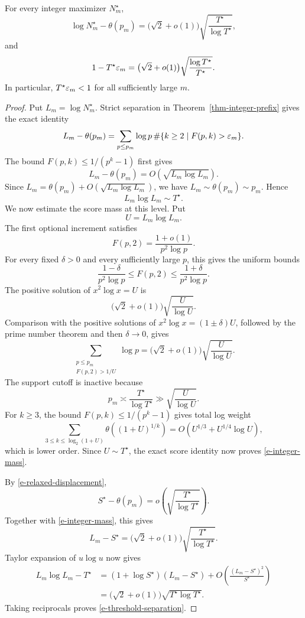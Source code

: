 \begin{proposition}
\label{prop-integer-threshold-scale}
For every integer maximizer \(N_m^\star\),
\begin{equation}
\label{e-integer-mass}
    \log N_m^\star-\theta(p_m)
    =
    \bigl(\sqrt2+o(1)\bigr)
    \sqrt{\frac{T^\star}{\log T^\star}},
\end{equation}
and
\begin{equation}
\label{e-threshold-separation}
    1-T^\star\varepsilon_m
    =
    \bigl(\sqrt2+o(1)\bigr)
    \sqrt{\frac{\log T^\star}{T^\star}}.
\end{equation}
In particular, \(T^\star\varepsilon_m<1\) for all sufficiently large \(m\).
\end{proposition}

\begin{proof}
Put \(L_m=\log N_m^\star\). Strict separation in
Theorem~\ref{thm-integer-prefix} gives the exact identity
\[
    L_m-\theta(p_m)
    =
    \sum_{p\leq p_m}\log p\,
    \#\{k\geq2\mid F(p,k)>\varepsilon_m\}.
\]
The bound \(F(p,k)\leq1/(p^k-1)\) first gives
\[
    L_m-\theta(p_m)
    =
    O\left(\sqrt{L_m\log L_m}\right).
\]
Since \(L_m=\theta(p_m)+O(\sqrt{L_m\log L_m})\), we have
\(L_m\sim\theta(p_m)\sim p_m\). Hence
\[
    L_m\log L_m\sim T^\star.
\]
We now estimate the score mass at this level. Put
\[
    U=L_m\log L_m.
\]
The first optional increment satisfies
\[
    F(p,2)
    =
    \frac{1+o(1)}{p^2\log p}.
\]
For every fixed \(\delta>0\) and every sufficiently large \(p\), this
gives the uniform bounds
\[
    \frac{1-\delta}{p^2\log p}
    \leq
    F(p,2)
    \leq
    \frac{1+\delta}{p^2\log p}.
\]
The positive solution of \(x^2\log x=U\) is
\[
    \bigl(\sqrt2+o(1)\bigr)
    \sqrt{\frac{U}{\log U}}.
\]
Comparison with the positive solutions of
\(x^2\log x=(1\pm\delta)U\), followed by the prime number theorem and
then \(\delta\to0\), gives
\[
    \sum_{\substack{p\leq p_m\\ F(p,2)>1/U}}\log p
    =
    \bigl(\sqrt2+o(1)\bigr)
    \sqrt{\frac{U}{\log U}}.
\]
The support cutoff is inactive because
\[
    p_m\asymp\frac{T^\star}{\log T^\star}
    \gg\sqrt{\frac{U}{\log U}}.
\]
For \(k\geq3\), the bound \(F(p,k)\leq1/(p^k-1)\) gives total log weight
\[
    \sum_{3\leq k\leq\log_2(1+U)}
    \theta\left((1+U)^{1/k}\right)
    =
    O(U^{1/3}+U^{1/4}\log U),
\]
which is lower order. Since \(U\sim T^\star\), the exact score identity
now proves \eqref{e-integer-mass}.

By \eqref{e-relaxed-displacement},
\[
    S^\star-\theta(p_m)
    =
    o\left(
        \sqrt{\frac{T^\star}{\log T^\star}}
    \right).
\]
Together with \eqref{e-integer-mass}, this gives
\[
    L_m-S^\star
    =
    \bigl(\sqrt2+o(1)\bigr)
    \sqrt{\frac{T^\star}{\log T^\star}}.
\]
Taylor expansion of \(u\log u\) now gives
\[
\begin{aligned}
    L_m\log L_m-T^\star
    &=
    (1+\log S^\star)(L_m-S^\star)
    +O\left(\frac{(L_m-S^\star)^2}{S^\star}\right)\\
    &=
    \bigl(\sqrt2+o(1)\bigr)
    \sqrt{T^\star\log T^\star}.
\end{aligned}
\]
Taking reciprocals proves \eqref{e-threshold-separation}.
\end{proof}

